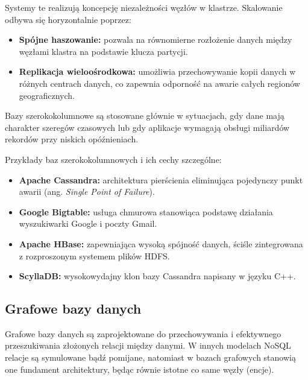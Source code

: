 Systemy te realizują koncepcję niezależności węzłów w klastrze. Skalowanie odbywa się horyzontalnie poprzez:
\begin{itemize}
    \item \textbf{Spójne haszowanie:} pozwala na równomierne rozłożenie danych między węzłami klastra na podstawie klucza partycji.
    \item \textbf{Replikacja wieloośrodkowa:} umożliwia przechowywanie kopii danych w różnych centrach danych, co zapewnia odporność na awarie całych regionów geograficznych.
\end{itemize}
Bazy szerokokolumnowe są stosowane głównie w sytuacjach, gdy dane mają charakter szeregów czasowych lub gdy aplikacje wymagają obsługi miliardów rekordów przy niskich opóźnieniach.


Przykłady baz szerokokolumnowych i ich cechy szczególne:
\begin{itemize}
    \item \textbf{Apache Cassandra:} architektura pierścienia eliminująca pojedynczy punkt awarii (ang. \emph{Single Point of Failure}).
    \item \textbf{Google Bigtable:} usługa chmurowa stanowiąca podstawę działania wyszukiwarki Google i poczty Gmail.
    \item \textbf{Apache HBase:} zapewniająca wysoką spójność danych, ściśle zintegrowana z rozproszonym systemem plików HDFS.
    \item \textbf{ScyllaDB:} wysokowydajny klon bazy Cassandra napisany w języku C++.
\end{itemize}
\subsection{Grafowe bazy danych}
Grafowe bazy danych są zaprojektowane do przechowywania i efektywnego przeszukiwania złożonych relacji między danymi. W innych modelach NoSQL relacje są symulowane bądź pomijane, natomiast w bazach grafowych stanowią one fundament architektury, będąc równie istotne co same węzły (encje).


